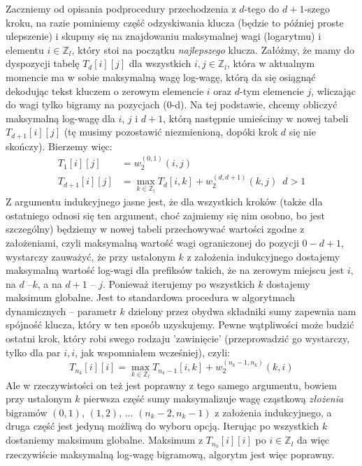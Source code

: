 \documentclass[a4paper]{article}
\begin{document}
Zaczniemy od opisania podprocedury przechodzenia z $d$-tego do $d+1$-szego kroku, na razie pominiemy część odzyskiwania klucza (będzie to później proste ulepszenie) i skupmy się na znajdowaniu maksymalnej wagi (logarytmu) i elementu $i \in \mathbb{Z}_l$, który stoi na początku \textit{najlepszego} klucza. Załóżmy, że mamy do dyspozycji tabelę $T_d[i][j]$ dla wszystkich $i,j \in \mathbb{Z}_l$, która w aktualnym momencie ma w sobie maksymalną wagę log-wagę, którą da się osiągnąć dekodując tekst kluczem o zerowym elemencie $i$ oraz $d$-tym elemencie $j$, wliczając do wagi tylko bigramy na pozycjach (0-d). Na tej podstawie, chcemy obliczyć maksymalną log-wagę dla $i$, $j$ i $d+1$, którą następnie umieścimy w nowej tabeli $T_{d+1}[i][j]$ (tę musimy pozostawić niezmienioną, dopóki krok $d$ się nie skończy). Bierzemy więc:
\begin{align*}
T_{1}[i][j] &= w_2^{(0,1)}(i, j) \\
T_{d+1}[i][j] &= \max_{k \in \mathbb{Z}_l} T_{d}[i, k] + w_2^{(d,d+1)}(k, j)\,\,\, d > 1
\end{align*}
Z argumentu indukcyjnego jasne jest, że dla wszystkich kroków (także dla ostatniego odnosi się ten argument, choć zajmiemy się nim osobno, bo jest szczególny) będziemy w nowej tabeli przechowywać wartości zgodne z założeniami, czyli maksymalną wartość wagi ograniczonej do pozycji $0-d+1$, wystarczy zauważyć, że przy ustalonym $k$ z założenia indukcyjnego dostajemy maksymalną wartość log-wagi dla prefiksów takich, że na zerowym miejscu jest $i$, na $d$ –$k$, a na $d+1$ – $j$. Ponieważ iterujemy po wszystkich $k$ dostajemy maksimum globalne. Jest to standardowa procedura w algorytmach dynamicznych – parametr $k$ dzielony przez obydwa składniki sumy zapewnia nam spójność klucza, który w ten sposób uzyskujemy. Pewne wątpliwości może budzić ostatni krok, który robi swego rodzaju 'zawinięcie' (przeprowadzić go wystarczy, tylko dla par $i,i$, jak wspomniałem wcześniej), czyli:
$$T_{n_k}[i][i] = \max_{k \in \mathbb{Z}_l} T_{n_k-1}[i, k] + w_2^{(n_k-1,n_k)}(k, i)$$
Ale w rzeczywistości  on też jest poprawny z tego samego argumentu, bowiem przy ustalonym $k$ pierwsza część sumy maksymalizuje wagę cząstkową \textit{złożenia} bigramów $(0,1)$, $(1,2)$, ... $(n_k-2, n_k-1)$ z założenia indukcyjnego, a druga część jest jedyną możliwą do wyboru opcją. Iterując po wszystkich $k$ dostaniemy maksimum globalne. Maksimum z $T_{n_k}[i][i]$ po $i \in \mathbb{Z}_l$ da więc rzeczywiście maksymalną log-wagę bigramową, algorytm jest więc poprawny.\\\\
\end{document}
